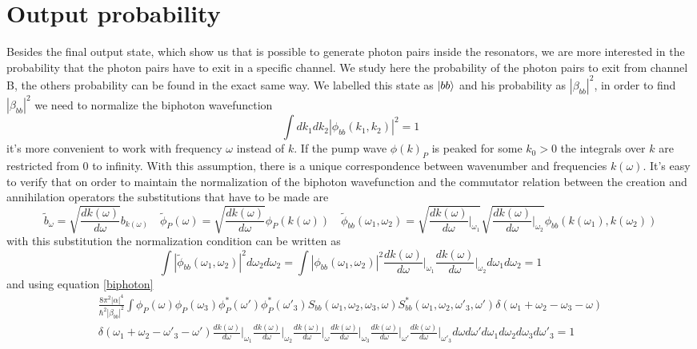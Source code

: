 \section{Output probability}
Besides the final output state, which show us that is possible to generate photon pairs inside the resonators, we are more interested in the probability that the photon pairs have to exit in a specific channel. We study here the probability of the photon pairs to exit from channel B, the others probability can be found in the exact same way. We labelled this state as $\ket{bb}$ and his probability as $|\beta_{bb}|^2$, in order to find $|\beta_{bb}|^2$ we need to normalize the biphoton wavefunction
\begin{equation}\int dk_1 dk_2 |\phi_{bb}(k_1,k_2)|^2 = 1 \end{equation}
it's more convenient to work with frequency $\omega$ instead of $k$. If the pump wave $\phi(k)_P$ is peaked for some $k_0>0$ the integrals over $k$ are restricted from 0 to infinity. With this assumption, there is a unique correspondence between wavenumber and frequencies $k(\omega)$. It's easy to verify that on order to maintain the normalization of the biphoton wavefunction and the commutator relation between the creation and annihilation operators the substitutions that have to be made are
\begin{equation}\widetilde{b}_\omega = \sqrt{\frac{dk(\omega)}{d\omega}}b_{k(\omega)} \quad \widetilde{\phi}_P(\omega) = \sqrt{\frac{dk(\omega)}{d\omega}}\phi_P(k(\omega)) \quad \widetilde{\phi}_{bb}(\omega_1,\omega_2) = \sqrt{\frac{dk(\omega)}{d\omega}\Bigg|_{\omega_1}}\sqrt{\frac{dk(\omega)}{d\omega}\Bigg|_{\omega_2}}\phi_{bb}(k(\omega_1),k(\omega_2)) \end{equation}
with this substitution the normalization condition can be written as
\begin{equation}\int |\widetilde{\phi}_{bb}(\omega_1,\omega_2)|^2d\omega_2d\omega_2 = \int |\phi_{bb}(\omega_1,\omega_2)|^2\frac{dk(\omega)}{d\omega}\Bigg|_{\omega_1}\frac{dk(\omega)}{d\omega}\Bigg|_{\omega_2} d\omega_1d\omega_2 = 1\end{equation}
and using equation \eqref{biphoton}
\begin{multline}\frac{8\pi^2|\alpha|^4}{\hbar^2|\beta_{bb}|^2}\int \phi_P(\omega)\phi_P(\omega_3)\phi_P^*(\omega')\phi^*_P(\omega'_{3})S_{bb}(\omega_1,\omega_2,\omega_3,\omega)S^*_{bb}(\omega_1,\omega_2,\omega'_3,\omega')\delta(\omega_1+\omega_2-\omega_{3}-\omega)\\
\delta(\omega_1+\omega_2-\omega'_{3}-\omega')\frac{dk(\omega)}{d\omega}\Bigg|_{\omega_1}\frac{dk(\omega)}{d\omega}\Bigg|_{\omega_2}\frac{dk(\omega)}{d\omega}\Bigg|_{\omega}\frac{dk(\omega)}{d\omega}\Bigg|_{\omega_3}\frac{dk(\omega)}{d\omega}\Bigg|_{\omega'}\frac{dk(\omega)}{d\omega}\Bigg|_{\omega'_3} d\omega d\omega'  d\omega_1d\omega_2d\omega_3 d\omega'_3= 1 \end{multline}
